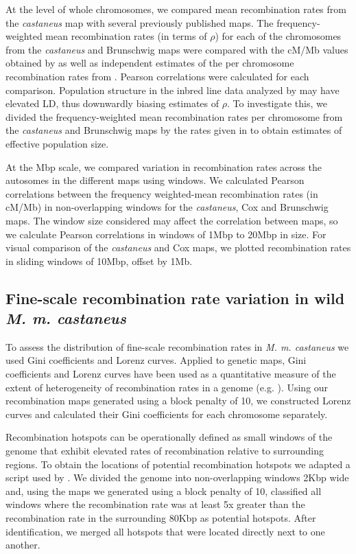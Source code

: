 At the level of whole chromosomes, we compared mean recombination rates from the \textit{castaneus} map with several previously published maps. The frequency-weighted mean recombination rates (in terms of $\rho$) for each of the chromosomes from the \textit{castaneus} and Brunschwig maps were compared with the cM/Mb values obtained by \cite{RN232} as well as independent estimates of the per chromosome recombination rates from \cite{RN184}. Pearson correlations were calculated for each comparison. Population structure in the inbred line data analyzed by \cite{RN156} may have elevated LD, thus downwardly biasing estimates of $\rho$. To investigate this, we divided the frequency-weighted mean recombination rates per chromosome from the \textit{castaneus} and Brunschwig maps by the rates given in \cite{RN232} to obtain estimates of effective population size.
 
At the Mbp scale, we compared variation in recombination rates across the autosomes in the different maps using windows. We calculated Pearson correlations between the frequency weighted-mean recombination rates (in cM/Mb) in non-overlapping windows for the \textit{castaneus}, Cox and Brunschwig maps. The window size considered may affect the correlation between maps, so we calculate Pearson correlations in windows of 1Mbp to 20Mbp in size. For visual comparison of the \textit{castaneus} and Cox maps, we plotted recombination rates in sliding windows of 10Mbp, offset by 1Mb. 

\subsection{Fine-scale recombination rate variation in wild \emph{M. m. castaneus}}

To assess the distribution of fine-scale recombination rates in \emph{M. m. castaneus} we used Gini coefficients and Lorenz curves. Applied to genetic maps, Gini coefficients and Lorenz curves have been used as a quantitative measure of the extent of heterogeneity of recombination rates in a genome (e.g. \citealt{RN333}). Using our recombination maps generated using a block penalty of 10, we constructed Lorenz curves and calculated their Gini coefficients for each chromosome separately.

	Recombination hotspots can be operationally defined as small windows of the genome that exhibit elevated rates of recombination relative to surrounding regions. To obtain the locations of potential recombination hotspots we adapted a script used by \cite{RN258}. We divided the genome into non-overlapping windows 2Kbp wide and, using the maps we generated using a block penalty of 10, classified all windows where the recombination rate was at least 5x greater than the recombination rate in the surrounding 80Kbp as potential hotspots. After identification, we merged all hotspots that were located directly next to one another.

